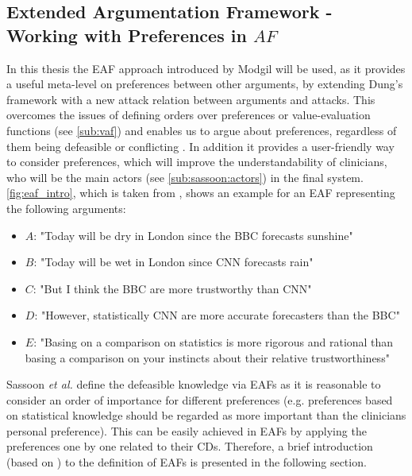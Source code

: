 \subsection{Extended Argumentation Framework - Working with Preferences in $AF$}
\label{sub:eaf}



In this thesis the \gls{EAF} approach introduced by Modgil \cite{Modgil2009} will be used, as it provides a useful meta-level on preferences between other arguments, by extending Dung's framework with a new attack relation between arguments and attacks. This overcomes the issues of defining orders over preferences or value-evaluation functions (see \autoref{sub:vaf}) and enables us to argue about preferences, regardless of them being  defeasible or conflicting \cite{amgoud2000}. In addition it provides a user-friendly way to consider preferences, which will improve the understandability of clinicians, who will be the main actors (see \autoref{sub:sassoon:actors}) in the final system.
\autoref{fig:eaf_intro}, which is taken from \cite{Modgil2009}, shows an example for an \gls{EAF} representing the following arguments:

\begin{itemize}
	\item $A$: "Today will be dry in London since the BBC forecasts sunshine"
	\item $B$: "Today will be wet in London since CNN forecasts rain"
	\item $C$: "But I think the BBC are more trustworthy than CNN"
	\item $D$: "However, statistically CNN are more accurate forecasters than the BBC"
	\item $E$: "Basing on a comparison on statistics is more rigorous and rational than basing a comparison on your instincts about their relative trustworthiness"
\end{itemize}

\bigskip

Sassoon \textit{et al.} define the defeasible knowledge via \Glspl{EAF} \cite{sassoon2016CD} as it is reasonable to consider an order of importance for different preferences (e.g. preferences based on statistical knowledge should be regarded as more important than the clinicians personal preference). This can be easily achieved in \glspl{EAF} by applying the preferences one by one related to their \glspl{CD}. Therefore, a brief introduction (based on \cite{Modgil2009}) to the definition of \glspl{EAF} is presented in the following section.

